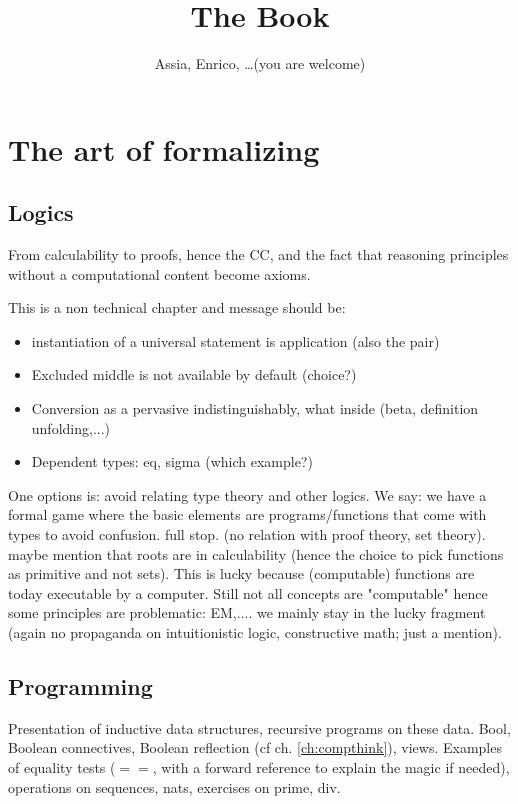 \documentclass{book}
\title{The Book}
\author{Assia, Enrico, \ldots (you are welcome)}
\begin{document}
\maketitle
\tableofcontents{}





\part{The art of formalizing}

\chapter{Logics}

From calculability to proofs, hence the CC, and the fact that
reasoning principles without a computational content become axioms.

This is a non technical chapter and message should be:
\begin{itemize}
\item instantiation of a universal statement is application (also the pair)
\item Excluded middle is not available by default (choice?)
\item Conversion as a pervasive indistinguishably, what inside
  (beta, definition unfolding,...)
\item Dependent types: eq, sigma (which example?)
\end{itemize}

One options is: avoid relating type theory and other logics. We say:
we have a formal game where the basic elements are programs/functions
that come with types to avoid confusion. full stop. (no relation with
proof theory, set theory). maybe mention that roots are in calculability (hence
the choice to pick functions as primitive and not sets). This is lucky because
(computable) functions are today executable by a computer.  Still not all
concepts are "computable" hence some principles are problematic: EM,.... we
mainly stay in the lucky fragment (again no propaganda on intuitionistic logic,
constructive math; just a mention).

\chapter{Programming}

Presentation of inductive data structures, recursive programs on these
data.
Bool, Boolean connectives, Boolean reflection (cf
ch. \ref{ch:compthink}), views.
Examples of equality tests ($==$, with a forward reference to
explain the magic if needed), operations on sequences, nats,
exercises on prime, div.
\end{document}
